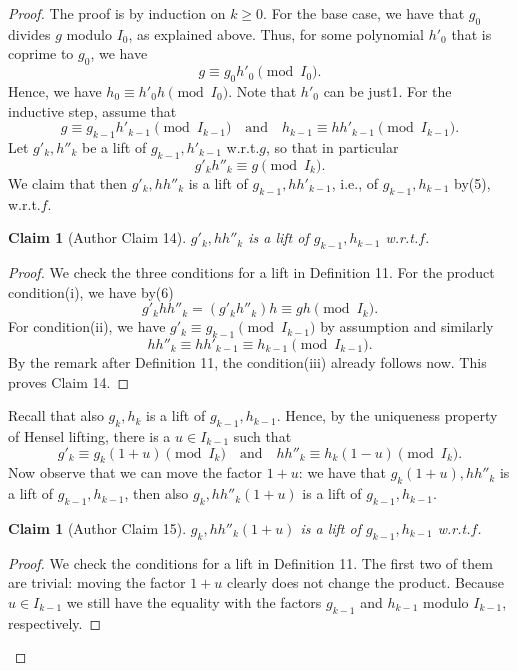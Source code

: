\documentclass[10pt,a4paper]{article}
\newtheorem{ntclaim}[nttheorem]{Claim}
\begin{document}
\begin{proof}
The proof is by induction on $k\geq0$. For the base case, we have that $g_0$ divides $g$ modulo $I_0$, as explained above. Thus, for some polynomial $h'_0$ that is coprime to $g_0$, we have
\[g\equiv g_0h'_0\pmod{I_0}.\]
Hence, we have $h_0\equiv h'_0h\pmod{I_0}$. Note that $h'_0$ can be just1.
For the inductive step, assume that
\begin{equation}g\equiv g_{k-1}h'_{k-1}\pmod{I_{k-1}}\quad\text{and}\quad h_{k-1}\equiv hh'_{k-1}\pmod{I_{k-1}}.\tag{5}\end{equation}
Let $g'_k,h''_k$ be a lift of $g_{k-1},h'_{k-1}$ w.r.t.$g$, so that in particular
\begin{equation}g'_kh''_k\equiv g\pmod{I_k}.\tag{6}\end{equation}
We claim that then $g'_k,hh''_k$ is a lift of $g_{k-1},hh'_{k-1}$, i.e., of $g_{k-1},h_{k-1}$ by(5), w.r.t.$f$.
\begin{ntclaim}[Author Claim 14]
$g'_k,hh''_k$ is a lift of $g_{k-1},h_{k-1}$ w.r.t.$f$.
\end{ntclaim}
\begin{proof}
We check the three conditions for a lift in Definition 11. For the product condition(i), we have by(6)
\[g'_khh''_k=(g'_kh''_k)h\equiv gh\pmod{I_k}.\]
For condition(ii), we have $g'_k\equiv g_{k-1}\pmod{I_{k-1}}$ by assumption and similarly
\[hh''_k\equiv hh'_{k-1}\equiv h_{k-1}\pmod{I_{k-1}}.\]
By the remark after Definition 11, the condition(iii) already follows now. This proves Claim 14.
\end{proof}
Recall that also $g_k,h_k$ is a lift of $g_{k-1},h_{k-1}$. Hence, by the uniqueness property of Hensel lifting, there is a $u\in I_{k-1}$ such that
\begin{equation}g'_k\equiv g_k(1+u)\pmod{I_k}\quad\text{and}\quad hh''_k\equiv h_k(1-u)\pmod{I_k}.\tag{7}\end{equation}
Now observe that we can move the factor $1+u$: we have that $g_k(1+u),hh''_k$ is a lift of $g_{k-1},h_{k-1}$, then also $g_k,hh''_k(1+u)$ is a lift of $g_{k-1},h_{k-1}$.
\begin{ntclaim}[Author Claim 15]
$g_k,hh''_k(1+u)$ is a lift of $g_{k-1},h_{k-1}$ w.r.t.$f$.
\end{ntclaim}
\begin{proof}
We check the conditions for a lift in Definition 11. The first two of them are trivial: moving the factor $1+u$ clearly does not change the product. Because $u\in I_{k-1}$ we still have the equality with the factors $g_{k-1}$ and $h_{k-1}$ modulo $I_{k-1}$, respectively.

\end{proof}
\end{proof}
\end{document}
